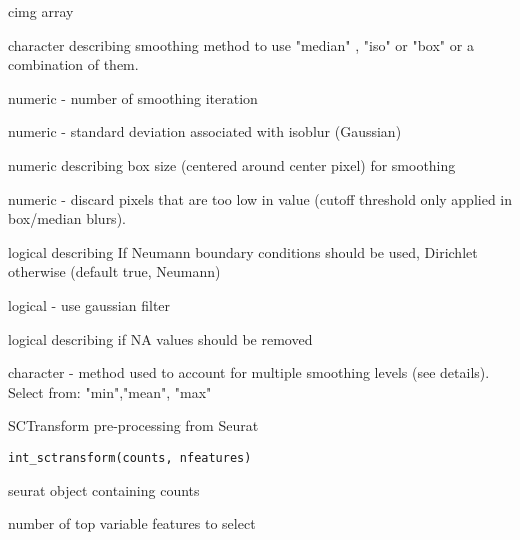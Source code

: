 \documentclass[a4paper]{book}
\begin{document}
\begin{Arguments}
\begin{ldescription}
\item[\code{image}] cimg array

\item[\code{method}] character describing smoothing method to use "median" ,
"iso"  or "box" or a combination of them.

\item[\code{iter}] numeric - number of smoothing iteration

\item[\code{sigma}] numeric - standard deviation associated with isoblur (Gaussian)

\item[\code{box}] numeric describing box size (centered around center pixel)
for smoothing

\item[\code{threshold}] numeric - discard pixels that are too low in value (cutoff
threshold only applied in box/median blurs).

\item[\code{neuman}] logical describing If Neumann boundary conditions should be
used, Dirichlet otherwise (default true, Neumann)

\item[\code{gaussian}] logical - use gaussian filter

\item[\code{na.rm}] logical describing if NA values should be removed

\item[\code{across\_levels}] character - method used to account for multiple
smoothing levels (see details). Select from: "min","mean", "max"
\end{ldescription}
\end{Arguments}
%
\begin{Description}
SCTransform pre-processing from Seurat
\end{Description}
%
\begin{Usage}
\begin{verbatim}
int_sctransform(counts, nfeatures)
\end{verbatim}
\end{Usage}
%
\begin{Arguments}
\begin{ldescription}
\item[\code{counts}] seurat object containing counts

\item[\code{nfeatures}] number of top variable features to select
\end{ldescription}
\end{Arguments}
\end{document}
